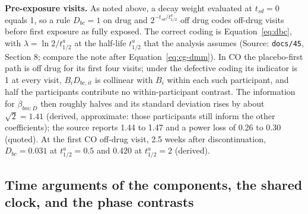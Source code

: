 \documentclass[11pt]{article}
\newcommand{\code}[1]{\texttt{#1}}
\begin{document}
\textbf{Pre-exposure visits.} As noted above, a decay weight evaluated
at $t_{sd} = 0$ equals 1, so a rule $D_{bc} = 1$ on drug and $2^{-t_{sd}/t_{1/2}^a}$ off
drug codes off-drug visits before first exposure as fully exposed. The
correct coding is Equation~\eqref{eq:dbc}, with
$\lambda = \ln 2/t_{1/2}^a$ at the half-life $t_{1/2}^a$ that the
analysis assumes (Source: \code{docs/45}, Section 8; compare the note
after Equation~\eqref{eq:cg-dmm}). In CO the placebo-first path is off drug for
its first four visits; under the defective coding its indicator is 1 at
every visit, $B_i D_{bc,it}$ is collinear with $B_i$ within each such
participant, and half the participants contribute no within-participant
contrast. The information for $\beta_{bm:D}$ then roughly halves and its
standard deviation rises by about $\sqrt 2 = 1.41$ (derived, approximate:
those participants still inform the other coefficients); the source
reports 1.44 to 1.47 and a power loss of 0.26 to 0.30 (quoted). At the
first CO off-drug visit, 2.5 weeks after discontinuation,
$D_{bc} = 0.031$ at $t_{1/2}^a = 0.5$ and $0.420$ at $t_{1/2}^a = 2$
(derived).

\subsection{Time arguments of the components, the shared clock, and the
phase contrasts}
\label{sec:invb-clocks}
\end{document}
